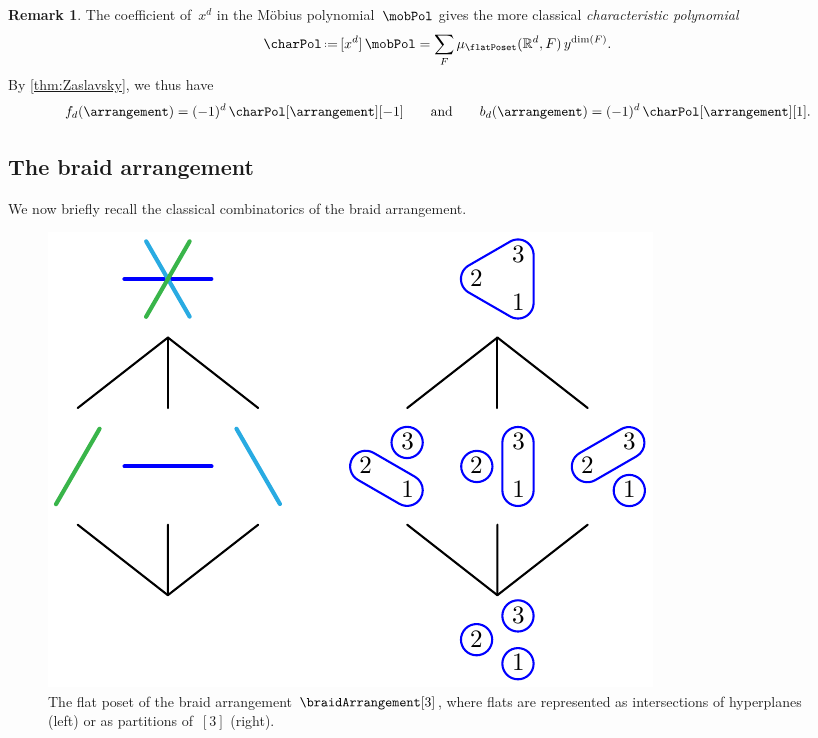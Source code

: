 \documentclass{amsart}
\newcommand{\darkblue}{\color{darkblue}} %
\newcommand{\vincent}[1]{\todo[color=blue!30]{\rm #1 \\ \hfill --- V.}}
\theoremstyle{definition}
\newtheorem{remark}[theorem]{Remark}
\newcommand{\R}{\mathbb{R}} %
\newcommand{\eqdef}{\mbox{\,\raisebox{0.2ex}{\scriptsize\ensuremath{\mathrm:}}\ensuremath{=}\,}} %
\newcommand{\defn}[1]{\textsl{\darkblue #1}} %
\begin{document}
\begin{remark}
\label{rem:characteristicPolynomial}
The coefficient of~$x^d$ in the M\"obius polynomial~$\mobPol$ gives the more classical \defn{characteristic polynomial}
\[
\charPol \eqdef [x^d] \, \mobPol = \sum_F \mu_{\flatPoset}(\R^d,F) \, y^{\dim(F)}.
\]
By \cref{thm:Zaslavsky}, we thus have
\[
f_d(\arrangement) = (-1)^d \, \charPol[\arrangement][-1] 
\qquad\text{and}\qquad
b_d(\arrangement) = (-1)^d \, \charPol[\arrangement][1].
\]
\end{remark}


\subsection{The braid arrangement}
\label{subsec:braidArrangement}

We now briefly recall the classical combinatorics of the braid arrangement.
\vincent{add refs?}


\begin{figure}
	\centerline{\includegraphics[scale=.9]{figures/intersectionPosetBraidArrangement3}}
	\caption{The flat poset of the braid arrangement $\braidArrangement[3]$, where flats are represented as intersections of hyperplanes (left) or as partitions of~$[3]$ (right).}
	\label{fig:intersectionPosetBraidArrangement3}
\end{figure}
\end{document}
